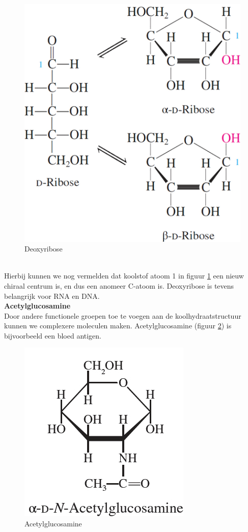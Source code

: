 \documentclass[a4paper,kul]{kulakarticle} %
\begin{document}
\begin{figure}[h]
	\centering
	\includegraphics[width=0.4\linewidth]{deoxyribosealphabeta}
	\caption[Deoxyribose]{Deoxyribose}
	\label{fig:deoxyribosealphabeta}
\end{figure}\\
Hierbij kunnen we nog vermelden dat koolstof atoom 1 in figuur \ref{fig:deoxyribosealphabeta} een nieuw chiraal centrum is, en dus een anomeer C-atoom is. Deoxyribose is tevens belangrijk voor RNA en DNA.\\
\textbf{Acetylglucosamine}\\
Door andere functionele groepen toe te voegen aan de koolhydraatstructuur kunnen we complexere moleculen maken. Acetylglucosamine (figuur \ref{fig:acetylglucosamine}) is bijvoorbeeld een bloed antigen.
\begin{figure}[h]
	\centering
	\includegraphics[width=0.4\linewidth]{Acetylglucosamine}
	\caption[Acetylglucosamine]{Acetylglucosamine}
	\label{fig:acetylglucosamine}
\end{figure}
\end{document}
